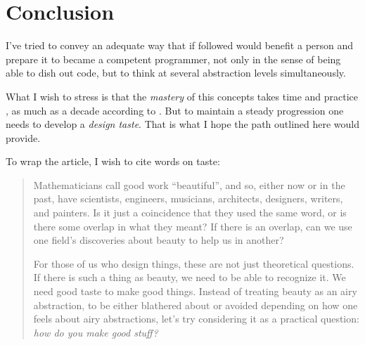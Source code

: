 \section{Conclusion}

I've tried to convey an adequate way that if followed would benefit a person and
prepare it to became a competent programmer, not only in the sense of being able
to dish out code, but to think at several abstraction levels simultaneously. 

What I wish to stress is that the \emph{mastery} of this concepts takes
time and practice \cite{programming:chamond__sod}, as much as a decade according to
\cite{education:norvig__teach_yourself_programming}. But to maintain a steady
progression one needs to develop a \emph{design taste}. That is what I hope the
path outlined here would provide.

To wrap the article, I wish to cite \cite{education:paul_graham__a_taste_for_makers} words on taste:

\begin{quotation}

    Mathematicians call good work ``beautiful'', and so, either now or in the
    past, have scientists, engineers, musicians, architects, designers, writers,
    and painters. Is it just a coincidence that they used the same word, or is
    there some overlap in what they meant? If there is an overlap, can we use
    one field's discoveries about beauty to help us in another?

    For those of us who design things, these are not just theoretical questions.
    If there is such a thing as beauty, we need to be able to recognize it. We
    need good taste to make good things. Instead of treating beauty as an airy
    abstraction, to be either blathered about or avoided depending on how one
    feels about airy abstractions, let's try considering it as a practical
    question: \emph{how do you make good stuff?}

\end{quotation}
